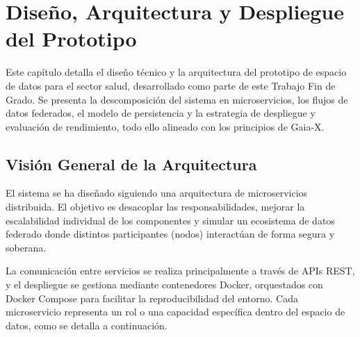 %
%


\chapter{Diseño, Arquitectura y Despliegue del Prototipo}
\label{chap:arquitectura}

Este capítulo detalla el diseño técnico y la arquitectura del prototipo de espacio de datos para el sector salud, desarrollado como parte de este Trabajo Fin de Grado. Se presenta la descomposición del sistema en microservicios, los flujos de datos federados, el modelo de persistencia y la estrategia de despliegue y evaluación de rendimiento, todo ello alineado con los principios de Gaia-X.

\section{Visión General de la Arquitectura}

El sistema se ha diseñado siguiendo una arquitectura de microservicios distribuida. El objetivo es desacoplar las responsabilidades, mejorar la escalabilidad individual de los componentes y simular un ecosistema de datos federado donde distintos participantes (nodos) interactúan de forma segura y soberana.

La comunicación entre servicios se realiza principalmente a través de APIs REST, y el despliegue se gestiona mediante contenedores Docker, orquestados con Docker Compose para facilitar la reproducibilidad del entorno. Cada microservicio representa un rol o una capacidad específica dentro del espacio de datos, como se detalla a continuación.

